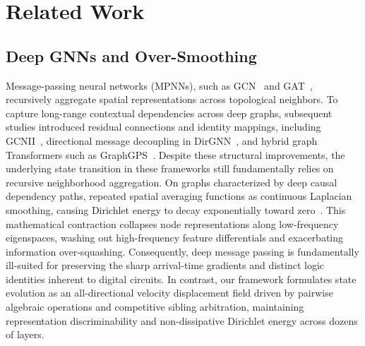 \section{Related Work}
\label{sec:related}

\subsection{Deep GNNs and Over-Smoothing}
Message-passing neural networks (MPNNs), such as GCN~\cite{kipf2017gcn} and GAT~\cite{velickovic2018gat}, recursively aggregate spatial representations across topological neighbors. To capture long-range contextual dependencies across deep graphs, subsequent studies introduced residual connections and identity mappings, including GCNII~\cite{gcnii}, directional message decoupling in DirGNN~\cite{dirgnn}, and hybrid graph Transformers such as GraphGPS~\cite{graphgps}. Despite these structural improvements, the underlying state transition in these frameworks still fundamentally relies on recursive neighborhood aggregation. On graphs characterized by deep causal dependency paths, repeated spatial averaging functions as continuous Laplacian smoothing, causing Dirichlet energy to decay exponentially toward zero~\cite{rusch2023survey}. This mathematical contraction collapses node representations along low-frequency eigenspaces, washing out high-frequency feature differentials and exacerbating information over-squashing. Consequently, deep message passing is fundamentally ill-suited for preserving the sharp arrival-time gradients and distinct logic identities inherent to digital circuits. In contrast, our framework formulates state evolution as an all-directional velocity displacement field driven by pairwise algebraic operations and competitive sibling arbitration, maintaining representation discriminability and non-dissipative Dirichlet energy across dozens of layers.

